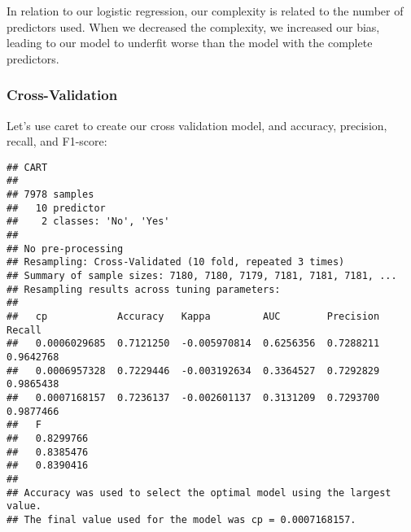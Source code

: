 \documentclass[
]{article}
\newenvironment{Shaded}{\begin{snugshade}}{\end{snugshade}}
\newcommand{\AttributeTok}[1]{\textcolor[rgb]{0.13,0.29,0.53}{#1}}
\newcommand{\CommentTok}[1]{\textcolor[rgb]{0.56,0.35,0.01}{\textit{#1}}}
\newcommand{\ConstantTok}[1]{\textcolor[rgb]{0.56,0.35,0.01}{#1}}
\newcommand{\ControlFlowTok}[1]{\textcolor[rgb]{0.13,0.29,0.53}{\textbf{#1}}}
\newcommand{\DecValTok}[1]{\textcolor[rgb]{0.00,0.00,0.81}{#1}}
\newcommand{\FunctionTok}[1]{\textcolor[rgb]{0.13,0.29,0.53}{\textbf{#1}}}
\newcommand{\NormalTok}[1]{#1}
\newcommand{\OtherTok}[1]{\textcolor[rgb]{0.56,0.35,0.01}{#1}}
\newcommand{\SpecialCharTok}[1]{\textcolor[rgb]{0.81,0.36,0.00}{\textbf{#1}}}
\newcommand{\StringTok}[1]{\textcolor[rgb]{0.31,0.60,0.02}{#1}}
\begin{document}
In relation to our logistic regression, our complexity is related to the
number of predictors used. When we decreased the complexity, we
increased our bias, leading to our model to underfit worse than the
model with the complete predictors.

\subsubsection{Cross-Validation}\label{cross-validation}

Let's use caret to create our cross validation model, and accuracy,
precision, recall, and F1-score:

\begin{Shaded}
\end{Shaded}

\begin{verbatim}
## CART 
## 
## 7978 samples
##   10 predictor
##    2 classes: 'No', 'Yes' 
## 
## No pre-processing
## Resampling: Cross-Validated (10 fold, repeated 3 times) 
## Summary of sample sizes: 7180, 7180, 7179, 7181, 7181, 7181, ... 
## Resampling results across tuning parameters:
## 
##   cp            Accuracy   Kappa         AUC        Precision  Recall   
##   0.0006029685  0.7121250  -0.005970814  0.6256356  0.7288211  0.9642768
##   0.0006957328  0.7229446  -0.003192634  0.3364527  0.7292829  0.9865438
##   0.0007168157  0.7236137  -0.002601137  0.3131209  0.7293700  0.9877466
##   F        
##   0.8299766
##   0.8385476
##   0.8390416
## 
## Accuracy was used to select the optimal model using the largest value.
## The final value used for the model was cp = 0.0007168157.
\end{verbatim}
\end{document}
